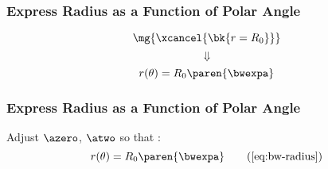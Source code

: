 

\begin{frame}\frametitle{Express Radius as a Function of Polar Angle}
%
\begin{equation}
	\mg{\xcancel{\bk{r = R_{0}}}}
\end{equation}
$$ \Downarrow $$
\begin{equation}
	r(\theta) = R_{0}\paren{\bwexpa}
\label{eq:bw-radius}
\end{equation}
\end{frame}

\begin{frame}\frametitle{Express Radius as a Function of Polar Angle\jumpLittle}
%
Adjust $ \azero$, $ \atwo$ so that :
\begin{equation}
	r(\theta) = R_{0}\paren{\bwexpa}
\tag{\ref{eq:bw-radius}}
\end{equation}
\end{frame}


\endinput  %
